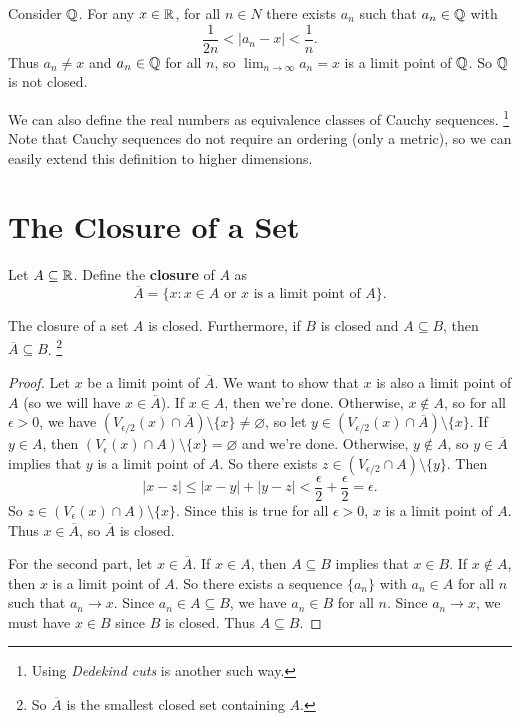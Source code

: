 \begin{example}
  Consider $\mathbb{Q}$. For any $x \in \mathbb{R}$, for all $n \in N$
  there exists $a_n$ such that $a_n \in \mathbb{Q}$ with
  \[
  \frac{1}{2n} < |a_n - x| < \frac{1}{n}
  .\]
  Thus $a_n \ne x$ and $a_n \in \mathbb{Q}$ for all $n$, so
  $\lim_{n \to \infty} a_n = x$ is a limit point of
  $\mathbb{Q}$. So $\mathbb{Q}$ is not closed.
\end{example}

\begin{remark}
  We can also define the real numbers as equivalence
  classes of Cauchy sequences.
  \footnote{Using \textit{Dedekind cuts} is another such way.}
  Note that Cauchy sequences
  do not require an ordering (only a metric), so we can
  easily extend this definition to higher dimensions.
\end{remark}

\section{The Closure of a Set}

\begin{definition}
  Let $A \subseteq \mathbb{R}$. Define the \textbf{closure}
  of $A$ as
  \[
    \overline{A} = \{x : x \in A \text{ or $x$ is a limit point of $A$}\}
  .\]
\end{definition}

\begin{theorem}
  The closure of a set $A$ is closed. Furthermore,
  if $B$ is closed and $A \subseteq B$, then
  $\overline{A} \subseteq B$.
  \footnote{So $\overline{A}$ is the smallest closed set
    containing $A$.}
\end{theorem}

\begin{proof}
  Let $x$ be a limit point of $\overline{A}$.
  We want to show that $x$ is also a limit point of $A$
  (so we will have $x \in \overline{A}$). If $x \in A$,
  then we're done. Otherwise, $x \notin A$, so for
  all $\epsilon > 0$, we have
  $(V_{\epsilon / 2}(x) \cap \overline{A}) \setminus \{x\} \ne \varnothing$,
  so let $y \in (V_{\epsilon / 2}(x) \cap \overline{A}) \setminus \{x\}$.
  If $y \in A$, then $(V_{\epsilon}(x) \cap A) \setminus \{x\}
  = \varnothing$ and we're done. Otherwise, $y \notin A$,
  so $y \in \overline{A}$ implies that $y$ is a limit
  point of $A$. So there exists
  $z \in (V_{\epsilon / 2} \cap A) \setminus \{y\}$.
  Then
  \[|x - z| \le |x - y| + |y - z| < \frac{\epsilon}{2} + \frac{\epsilon}{2} = \epsilon.\]
  So $z \in (V_\epsilon(x) \cap A) \setminus \{x\}$.
  Since this is true for all $\epsilon > 0$,
  $x$ is a limit point of $A$.
  Thus $x \in \overline{A}$, so $\overline{A}$ is closed.

  For the second part, let $x \in \overline{A}$. If
  $x \in A$, then $A \subseteq B$ implies that $x \in B$.
  If $x \notin A$, then $x$ is a limit point of $A$.
  So there exists a sequence $\{a_n\}$ with $a_n \in A$
  for all $n$ such that $a_n \to x$.
  Since $a_n \in A \subseteq B$, we have $a_n \in B$ for
  all $n$. Since $a_n \to x$, we must have
  $x \in B$ since $B$ is closed. Thus
  $A \subseteq B$.
\end{proof}

